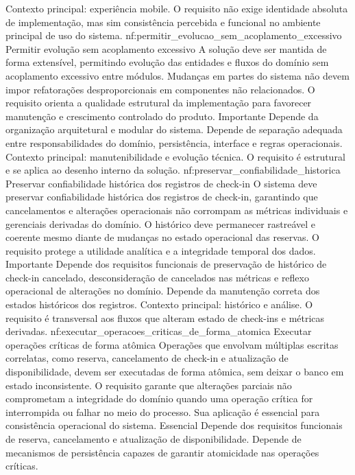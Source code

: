 {Contexto principal: experiência mobile. O requisito não exige identidade absoluta de implementação, mas sim consistência percebida e funcional no ambiente principal de uso do sistema.}
\reqfuncfull
{nf:permitir_evolucao_sem_acoplamento_excessivo}
{Permitir evolução sem acoplamento excessivo}
{A solução deve ser mantida de forma extensível, permitindo evolução das entidades e fluxos do domínio sem acoplamento excessivo entre módulos. Mudanças em partes do sistema não devem impor refatorações desproporcionais em componentes não relacionados. O requisito orienta a qualidade estrutural da implementação para favorecer manutenção e crescimento controlado do produto.}
{Importante}
{Depende da organização arquitetural e modular do sistema. Depende de separação adequada entre responsabilidades do domínio, persistência, interface e regras operacionais.}
{Contexto principal: manutenibilidade e evolução técnica. O requisito é estrutural e se aplica ao desenho interno da solução.}
\reqfuncfull
{nf:preservar_confiabilidade_historica}
{Preservar confiabilidade histórica dos registros de check-in}
{O sistema deve preservar confiabilidade histórica dos registros de check-in, garantindo que cancelamentos e alterações operacionais não corrompam as métricas individuais e gerenciais derivadas do domínio. O histórico deve permanecer rastreável e coerente mesmo diante de mudanças no estado operacional das reservas. O requisito protege a utilidade analítica e a integridade temporal dos dados.}
{Importante}
{Depende dos requisitos funcionais de preservação de histórico de check-in cancelado, desconsideração de cancelados nas métricas e reflexo operacional de alterações no domínio. Depende da manutenção correta dos estados históricos dos registros.}
{Contexto principal: histórico e análise. O requisito é transversal aos fluxos que alteram estado de check-ins e métricas derivadas.}
\reqfuncfull
{nf:executar_operacoes_criticas_de_forma_atomica}
{Executar operações críticas de forma atômica}
{Operações que envolvam múltiplas escritas correlatas, como reserva, cancelamento de check-in e atualização de disponibilidade, devem ser executadas de forma atômica, sem deixar o banco em estado inconsistente. O requisito garante que alterações parciais não comprometam a integridade do domínio quando uma operação crítica for interrompida ou falhar no meio do processo. Sua aplicação é essencial para consistência operacional do sistema.}
{Essencial}
{Depende dos requisitos funcionais de reserva, cancelamento e atualização de disponibilidade. Depende de mecanismos de persistência capazes de garantir atomicidade nas operações críticas.}
